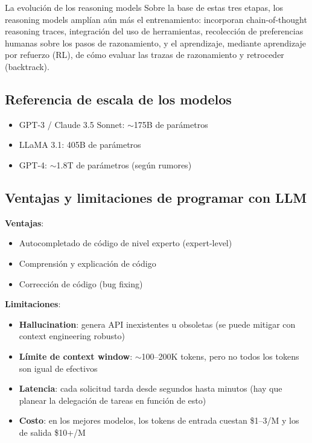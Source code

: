 \documentclass[a4paper]{article}
\begin{document}
\begin{importantbox}{La evolución de los reasoning models}
Sobre la base de estas tres etapas, los reasoning models amplían aún más el entrenamiento: incorporan chain-of-thought reasoning traces, integración del uso de herramientas, recolección de preferencias humanas sobre los pasos de razonamiento, y el aprendizaje, mediante aprendizaje por refuerzo (RL), de cómo evaluar las trazas de razonamiento y retroceder (backtrack).
\end{importantbox}

\subsection{Referencia de escala de los modelos}

\begin{itemize}
    \item GPT-3 / Claude 3.5 Sonnet: $\sim$175B de parámetros
    \item LLaMA 3.1: 405B de parámetros
    \item GPT-4: $\sim$1.8T de parámetros (según rumores)
\end{itemize}

\subsection{Ventajas y limitaciones de programar con LLM}

\textbf{Ventajas}:
\begin{itemize}
    \item Autocompletado de código de nivel experto (expert-level)
    \item Comprensión y explicación de código
    \item Corrección de código (bug fixing)
\end{itemize}

\textbf{Limitaciones}:
\begin{itemize}
    \item \textbf{Hallucination}: genera API inexistentes u obsoletas (se puede mitigar con context engineering robusto)
    \item \textbf{Límite de context window}: $\sim$100--200K tokens, pero no todos los tokens son igual de efectivos
    \item \textbf{Latencia}: cada solicitud tarda desde segundos hasta minutos (hay que planear la delegación de tareas en función de esto)
    \item \textbf{Costo}: en los mejores modelos, los tokens de entrada cuestan \$1--3/M y los de salida \$10+/M
\end{itemize}
\end{document}
